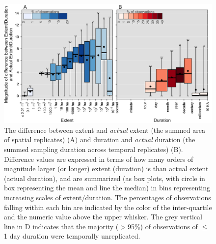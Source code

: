 \documentclass[12pt]{article}
\begin{document}
\begin{figure}[ht]
\includegraphics[width=1\textwidth]{../vignettes/figures/fig3.png}
\vspace{-0.2 cm}
\caption{The difference between extent and \emph{actual} extent (the summed area of spatial replicates) (A) and duration and \emph{actual} duration (the summed sampling duration across temporal replicates) (B). Difference values are expressed in terms of how many orders of magnitude larger (or longer) extent (duration) is than actual extent (actual duration), and are summarized (as box plots, with circle in box representing the mean and line the median) in bins representing increasing scales of extent/duration.  The percentages of observations falling within each bin are indicated by the color of the inter-quartile and the numeric value above the upper whisker. The grey vertical line in D indicates that the majority ($>$95\%) of observations of $\leq$1 day duration were temporally unreplicated.}
\label{afoto1}
\end{figure}
\end{document}
